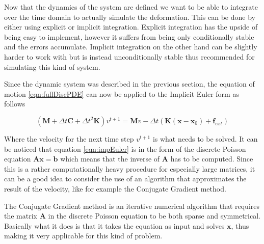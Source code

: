 Now that the dynamics of the system are defined we want to be able to integrate over the time domain to actually simulate the deformation. This can be done by either using explicit or implicit integration. Explicit integration has the upside of being easy to implement, however it suffers from being only conditionally stable and the errors accumulate. Implicit integration on the other hand can be slightly harder to work with but is instead unconditionally stable thus recommended for simulating this kind of system. 

Since the dynamic system was described in the previous section, the equation of motion \ref{eqn:fullDiscPDE} can now be applied to the Implicit Euler form as follows \cite{muller_ivm}

\begin{equation}\label{eqn:impEuler}
		(\mathbf{M} + \Delta t  \mathbf{C} + \Delta t^2 \mathbf{K})v^{t+1} = \mathbf{M} v - \Delta t (\mathbf{K}(\mathbf{x} - \mathbf{x}_0) +\mathbf{f}_{ext})
\end{equation}

Where the velocity for the next time step $v^{t+1}$ is what needs to be solved. It can be noticed that equation \ref{eqn:impEuler} is in the form of the discrete Poisson equation $\mathbf{Ax=b}$ which means that the inverse of $\mathbf{A}$ has to be computed. Since this is a rather computationally heavy procedure for especially large matrices, it can be a good idea to consider the use of an algorithm that approximates the result of the velocity, like for example the Conjugate Gradient method.

The Conjugate Gradient method is an iterative numerical algorithm that requires the matrix $\mathbf{A}$ in the discrete Poisson equation to be both sparse and symmetrical. Basically what it does is that it takes the equation as input and solves $\mathbf{x}$, thus making it very applicable for this kind of problem.